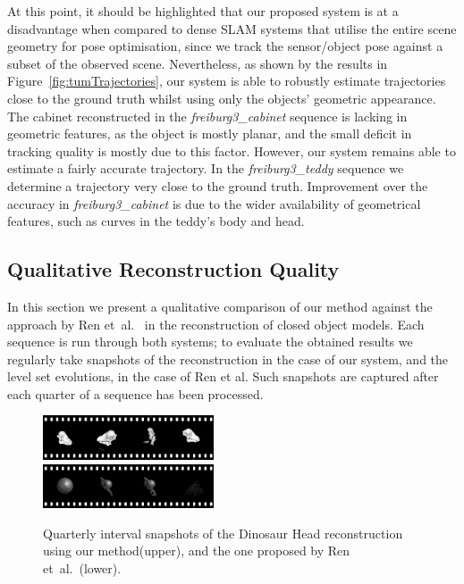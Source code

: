 At this point, it should be highlighted that our proposed system is at a disadvantage when compared to dense SLAM systems that utilise the entire scene geometry for pose optimisation, since we track the sensor/object pose against a subset of the observed scene.
Nevertheless, as shown by the results in Figure~\ref{fig:tumTrajectories}, our system is able to robustly estimate trajectories close to the ground truth whilst using only the objects' geometric appearance.
The cabinet reconstructed in the \textit{freiburg3\_cabinet} sequence is lacking in geometric features, as the object is mostly planar,
and the small deficit in tracking quality is mostly due to this factor.
However, our system remains able to estimate a fairly accurate trajectory. 
In the \textit{freiburg3\_teddy} sequence we determine a trajectory very close to the ground truth.
Improvement over the accuracy in \textit{freiburg3\_cabinet} is due to the wider availability of geometrical features, such as curves in the teddy's body and head.

\subsection{Qualitative Reconstruction Quality}
In this section we present a qualitative comparison of our method against the approach by Ren et~al.~\cite{Ren2013} in the reconstruction of closed object models. %
Each sequence is run through both systems; to evaluate the obtained results we regularly take snapshots of the reconstruction in the case of our system, and the level set evolutions, in the case of Ren et al.
Such snapshots are captured after each quarter of a sequence has been processed. %

\begin{figure}[!t]
	\centering
		\includegraphics[width=0.45\textwidth]{filmstrips/dino.png} \\
		\vspace{0.5mm}
		\includegraphics[width=0.45\textwidth]{filmstrips/dino_s3d_large.png}
	\caption{
        Quarterly interval snapshots of the Dinosaur Head reconstruction using our method(upper), and the one proposed by Ren et~al.~\cite{Ren2013}(lower).
	}
	\label{fig:dinoComparison}
\end{figure}


